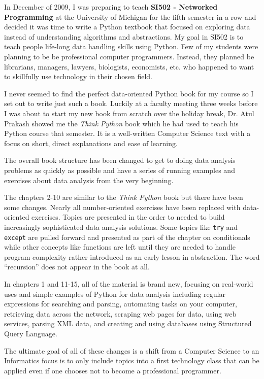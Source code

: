 \documentclass[11pt]{book}
\begin{document}
In December of 2009, I was preparing to teach
{\bf SI502 - Networked Programming} at the University of Michigan
for the fifth semester in a row and decided it was time
to write a Python textbook that focused on exploring data
instead of understanding algorithms and abstractions.
My goal in SI502 is to teach people life-long data handling 
skills using Python.  Few of my
students were planning to be be professional 
computer programmers.  Instead, they
planned be librarians, managers, lawyers, biologists, economists, etc. 
who happened to want to skillfully use technology in their chosen field.

I never seemed to find the perfect data-oriented Python
book for my course so I set out 
to write just such a book.  Luckily at a faculty meeting three weeks
before I was about to start my new book from scratch over 
the holiday break, 
Dr. Atul Prakash showed me the \emph{Think Python} book which he had
used to teach his Python course that semester.  
It is a well-written Computer Science text with a focus on 
short, direct explanations and ease of learning.  

The overall book structure
has been changed to get to doing data analysis problems as quickly as
possible and have a series of running examples and exercises 
about data analysis from the very beginning.  

The chapters 2-10 are similar to the \emph{Think Python} book
but there have been some changes.  Nearly all number-oriented
exercises have been replaced with data-oriented exercises.
Topics are presented in the order to needed to build increasingly
sophisticated data analysis solutions.  Some topics like {\tt try} and
{\tt except} are pulled forward and presented as part of the chapter
on conditionals while other concepts like functions are left until 
they are needed to handle program complexity rather introduced 
as an early lesson in abstraction.  The word ``recursion'' does not 
appear in the book at all.

In chapters 1 and 11-15, all of the material is brand new, focusing
on real-world uses and simple examples of Python for data analysis 
including regular expressions for searching and parsing, 
automating tasks on your computer, retrieving data across 
the network, scraping web pages for data, 
using web services, parsing XML data, and creating 
and using databases using Structured Query Language.

The ultimate goal of all of these changes is a shift from a 
Computer Science to an Informatics
focus is to only include topics into a first technology 
class that can be applied even if one chooses not to 
become a professional programmer.
\end{document}
